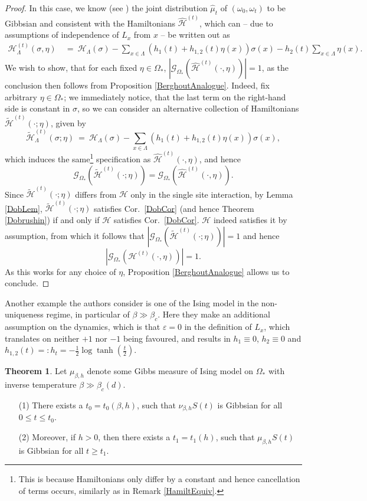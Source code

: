 \documentclass[12pt]{article}
\newcommand{\G}{\mathcal{G}}
\renewcommand{\H}{\mathcal{H}}
\newcommand{\oklepaj}[1]{\left(#1\right)}
\newcommand{\pika}{\boldsymbol{\cdot}}
\newcommand{\1}{\mathbbm{1}}
\newcommand{\5}{\vspace{0.5cm}}
\renewcommand{\tilde}{\widetilde}
\renewcommand{\hat}{\widehat}
\theoremstyle{definition}
\newtheorem{thm}{Theorem}[section]
\begin{document}
\begin{proof}
In this case, we know (see \cite{EFHR}) the joint distribution $\hat{\mu}_t$ of $(\omega_0,\omega_t)$ to be Gibbsian and consistent with the Hamiltonians $\hat{\H}^{(t)}$, which can -- due to assumptions of independence of $L_x$ from $x$ -- be written out as
\begin{align*}
\H_\Lambda^{(t)}(\sigma,\eta) ~&=~ \H_\Lambda(\sigma) - \sum_{x\in\Lambda}\oklepaj{h_1(t)+h_{1,2}(t)\eta(x)}\sigma(x) - h_2(t)\sum_{x\in\Lambda}\eta(x).
\end{align*}
We wish to show, that for each fixed $\eta\in\Omega_*$, $|\G_{\Omega_*}(\hat{\H}^{(t)}(\pika,\eta))|=1$, as the conclusion then follows from Proposition \ref{BerghoutAnalogue}. Indeed, fix arbitrary $\eta\in\Omega_*$; we immediately notice, that the last term on the right-hand side is constant in $\sigma$, so we can consider an alternative collection of Hamiltonians $\tilde{\H}^{(t)}(\pika;\eta)$, given by
$$\tilde{\H}_\Lambda^{(t)}(\sigma;\eta) ~=~ \H_\Lambda(\sigma) - \sum_{x\in\Lambda}\oklepaj{h_1(t)+h_{1,2}(t)\eta(x)}\sigma(x),$$
which induces the same\footnote{This is because Hamiltonians only differ by a constant and hence cancellation of terms occurs, similarly as in Remark \ref{HamiltEquiv}.} specification as $\hat{\H}^{(t)}(\pika,\eta)$, and hence 
$$\G_{\Omega_*}(\tilde{\H}^{(t)}(\pika;\eta))=\G_{\Omega_*}(\hat{\H}^{(t)}(\pika,\eta)).$$
Since $\tilde{\H}^{(t)}(\pika;\eta)$ differs from $\H$ only in the single site interaction, by Lemma \ref{DobLem}, $\tilde{\H}^{(t)}(\pika;\eta)$ satisfies Cor.~\ref{DobCor} (and hence Theorem \ref{Dobrushin}) if and only if $\H$ satisfies Cor.~\ref{DobCor}. $\H$ indeed satisfies it by assumption, from which it follows that $|\G_{\Omega_*}(\tilde{\H}^{(t)}(\pika;\eta))|=1$ and hence 
$$|\G_{\Omega_*}(\H^{(t)}(\pika,\eta))|=1.$$
As this works for any choice of $\eta$, Proposition \ref{BerghoutAnalogue} allows us to conclude.
\end{proof}

Another example the authors consider is one of the Ising model in the non-uniqueness regime, in particular of $\beta\gg\beta_c$. Here they make an additional assumption on the dynamics, which is that $\varepsilon=0$ in the definition of $L_x$, which translates on neither $+1$ nor $-1$ being favoured, and results in $h_1\equiv 0$, $h_2\equiv 0$ and $h_{1,2}(t)=:h_t=-\frac{1}{2}\log\tanh(\frac{t}{2})$.

\begin{thm}\label{IsingTHM}
Let $\mu_{\beta,h}$ denote some Gibbs measure of Ising model on $\Omega_*$ with inverse temperature $\beta\gg\beta_c(d)$.
\begin{itemize}
	\item[(1)] There exists a $t_0=t_0(\beta,h)$, such that $\nu_{\beta,h}S(t)$ is Gibbsian for all $0\leq t\leq t_0$.
	\item[(2)] Moreover, if $h>0$, then there exists a $t_1=t_1(h)$, such that $\mu_{\beta,h}S(t)$ is Gibbsian for all $t\geq t_1$.
\end{itemize} 
\end{thm}
\end{document}
